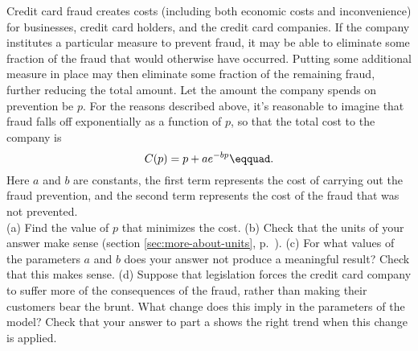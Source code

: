 Credit card fraud creates costs (including both economic costs and
inconvenience) for businesses, credit card holders, and the credit
card companies. If the company institutes a particular measure to
prevent fraud, it may be able to eliminate some fraction of the fraud
that would otherwise have occurred. Putting some additional measure in place
may then eliminate some fraction of the remaining fraud, further reducing
the total amount. Let the amount the company spends on prevention be $p$.
For the reasons described above, it's reasonable to imagine that fraud
falls off exponentially as a function of $p$, so that the total cost
to the company is
\begin{equation*}
  C(p) = p+ae^{-bp}\eqquad.
\end{equation*}
Here $a$ and $b$ are constants, the first term represents the cost of
carrying out the fraud prevention, and the second term represents
the cost of the fraud that was not prevented.\\
(a) Find the value of $p$ that minimizes the cost.\answercheck\hwendpart
(b) Check that the units of your answer make sense (section \ref{sec:more-about-units}, p.~\pageref{sec:more-about-units}).\hwendpart
(c) For what values of the parameters $a$ and
$b$ does your answer not produce a meaningful result? Check that this
makes sense.\hwendpart
(d) Suppose that legislation forces the credit card company to suffer
more of the consequences of the fraud, rather than making their customers
bear the brunt. What change does this imply in the parameters of the model?
Check that your answer to part a shows the right trend when this change
is applied.
